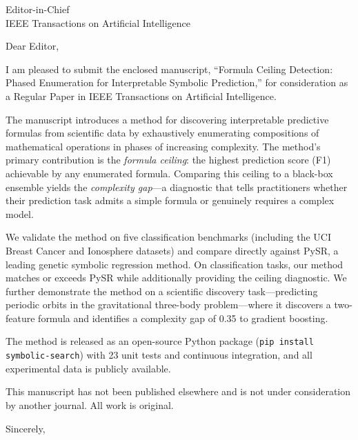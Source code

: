 \documentclass[12pt]{letter}
\begin{document}
\begin{letter}{Editor-in-Chief\\
IEEE Transactions on Artificial Intelligence}

\opening{Dear Editor,}

I am pleased to submit the enclosed manuscript, ``Formula Ceiling
Detection: Phased Enumeration for Interpretable Symbolic Prediction,''
for consideration as a Regular Paper in IEEE Transactions on
Artificial Intelligence.

The manuscript introduces a method for discovering interpretable
predictive formulas from scientific data by exhaustively enumerating
compositions of mathematical operations in phases of increasing
complexity. The method's primary contribution is the \emph{formula
ceiling}: the highest prediction score (F1) achievable by any
enumerated formula. Comparing this ceiling to a black-box ensemble
yields the \emph{complexity gap}---a diagnostic that tells
practitioners whether their prediction task admits a simple formula
or genuinely requires a complex model.

We validate the method on five classification benchmarks (including
the UCI Breast Cancer and Ionosphere datasets) and compare directly
against PySR, a leading genetic symbolic regression method. On
classification tasks, our method matches or exceeds PySR while
additionally providing the ceiling diagnostic. We further demonstrate
the method on a scientific discovery task---predicting periodic orbits
in the gravitational three-body problem---where it discovers a
two-feature formula and identifies a complexity gap of 0.35 to
gradient boosting.

The method is released as an open-source Python package
(\texttt{pip install symbolic-search}) with 23 unit tests and
continuous integration, and all experimental data is publicly
available.

This manuscript has not been published elsewhere and is not under
consideration by another journal. All work is original.

\closing{Sincerely,}

\end{letter}
\end{document}
